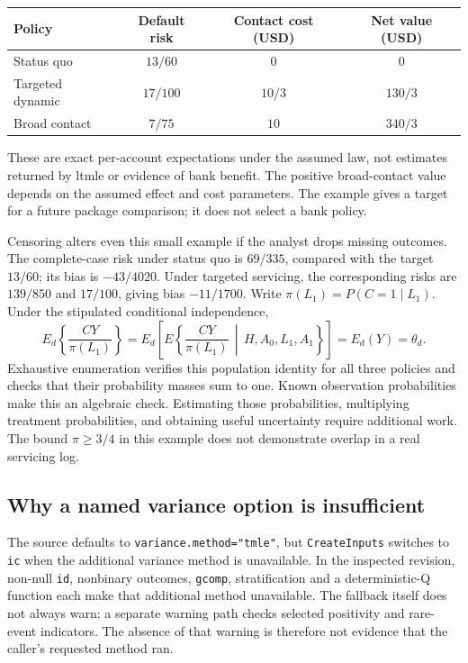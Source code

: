 \begin{center}\small
\begin{tabular}{lccc}
\toprule
Policy & Default risk & Contact cost (USD) & Net value (USD)\\
\midrule
Status quo & $13/60$ & $0$ & $0$\\
Targeted dynamic & $17/100$ & $10/3$ & $130/3$\\
Broad contact & $7/75$ & $10$ & $340/3$\\
\bottomrule
\end{tabular}\end{center}
These are exact per-account expectations under the assumed law, not estimates
returned by ltmle or evidence of bank benefit. The positive broad-contact value
depends on the assumed effect and cost parameters. The example gives a target
for a future package comparison; it does not select a bank policy.
\citep{exec23_ltmle_exact}

Censoring alters even this small example if the analyst drops missing outcomes.
The complete-case risk under status quo is $69/335$, compared with the target
$13/60$; its bias is $-43/4020$. Under targeted servicing, the corresponding
risks are $139/850$ and $17/100$, giving bias $-11/1700$. Write
$\pi(L_1)=P(C=1\mid L_1)$. Under the stipulated conditional independence,
\begin{equation}
 E_d\!\left\{\frac{CY}{\pi(L_1)}\right\}
 =E_d\!\left[E\!\left\{\frac{CY}{\pi(L_1)}\,
          \middle|\,H,A_0,L_1,A_1\right\}\right]
 =E_d(Y)=\theta_d.
 \label{exec23:ltmle-censoring}
\end{equation}
Exhaustive enumeration verifies this population identity for all three
policies and checks that their probability masses sum to one. Known
observation probabilities make this an algebraic check. Estimating those
probabilities, multiplying treatment probabilities, and obtaining useful
uncertainty require additional work. The bound $\pi\geq3/4$ in this example
does not demonstrate overlap in a real servicing log.
\citep{exec23_ltmle_exact}

\subsection{Why a named variance option is insufficient}

The source defaults to \texttt{variance.method="tmle"}, but
\texttt{CreateInputs} switches to \texttt{ic} when the additional variance
method is unavailable. In the inspected revision, non-null \texttt{id},
nonbinary outcomes, \texttt{gcomp}, stratification and a deterministic-Q
function each make that additional method unavailable. The fallback itself
does not always warn: a separate warning path checks selected positivity and
rare-event indicators. The absence of that warning is therefore not evidence
that the caller's requested method ran.~\citep{exec23_ltmle_source}

